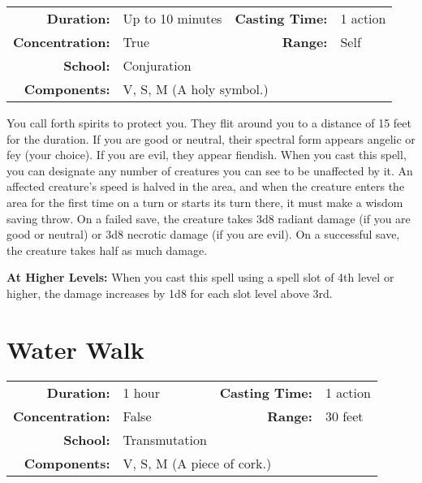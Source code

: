 \documentclass[a5paper, 12pt]{memoir}
\begin{document}
{
\small\centering\vspace{-6pt}
\begin{tabular}{rlrl}
\toprule

\textbf{Duration:} & Up to 10 minutes &
\textbf{Casting Time:} & 1 action \\
\textbf{Concentration:} & True &
\textbf{Range:} & Self \\
\textbf{School:} & Conjuration \\
\textbf{Components:} & \multicolumn{3}{p{0.7\textwidth}}{V, S, M (A holy symbol.)}\\

\bottomrule
\end{tabular}
}

\vspace{1\baselineskip}\noindent You call forth spirits to protect you. They flit around you to a distance of 15 feet for the duration. If you are good or neutral, their spectral form appears angelic or fey (your choice). If you are evil, they appear fiendish. When you cast this spell, you can designate any number of creatures you can see to be unaffected by it. An affected creature's speed is halved in the area, and when the creature enters the area for the first time on a turn or starts its turn there, it must make a wisdom saving throw. On a failed save, the creature takes 3d8 radiant damage (if you are good or neutral) or 3d8 necrotic damage (if you are evil). On a successful save, the creature takes half as much damage.

\vspace{8pt} \noindent\textbf{At Higher Levels:} When you cast this spell using a spell slot of 4th level or higher, the damage increases by 1d8 for each slot level above 3rd.
\newpage
\section*{Water Walk}

{
\small\centering\vspace{-6pt}
\begin{tabular}{rlrl}
\toprule

\textbf{Duration:} & 1 hour &
\textbf{Casting Time:} & 1 action \\
\textbf{Concentration:} & False &
\textbf{Range:} & 30 feet \\
\textbf{School:} & Transmutation \\
\textbf{Components:} & \multicolumn{3}{p{0.7\textwidth}}{V, S, M (A piece of cork.)}\\

\bottomrule
\end{tabular}
}
\end{document}
